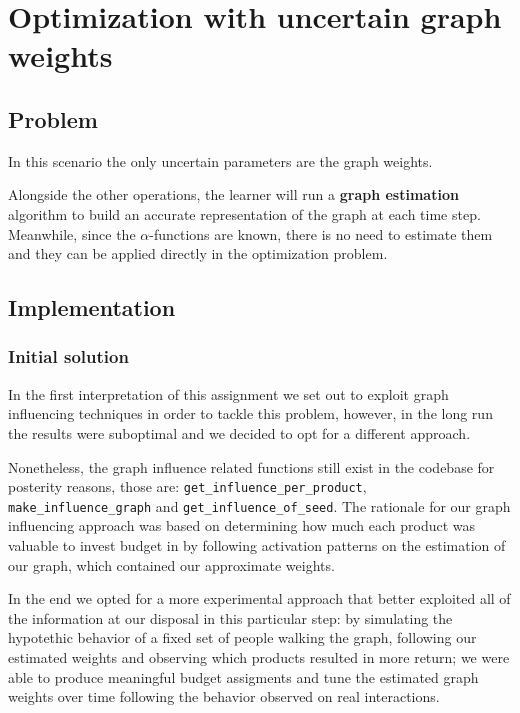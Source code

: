 \chapter{Optimization with uncertain graph weights}
\label{chap:unc_weights}

\section{Problem}
\label{sec:unc_w_problem}

In this scenario the only uncertain parameters are the graph weights.

Alongside the other operations, the learner will run a \textbf{graph estimation} algorithm to build an accurate representation of the graph at each time step.
Meanwhile, since the $\alpha$-functions are known, there is no need to estimate them and they can be applied directly in the optimization problem.

\section{Implementation}
\label{sec:unc_w_impl}

\subsection{Initial solution}

In the first interpretation of this assignment we set out to exploit graph influencing techniques in order to tackle this problem, however, in the long run the results were suboptimal and we decided to opt for a different approach.

Nonetheless, the graph influence related functions still exist in the codebase for posterity reasons, those are: \texttt{get\_influence\_per\_product}, \texttt{make\_influence\_graph} and \texttt{get\_influence\_of\_seed}.
The rationale for our graph influencing approach was based on determining how much each product was valuable to invest budget in by following activation patterns on the estimation of our graph, which contained our approximate weights.

In the end we opted for a more experimental approach that better exploited all of the information at our disposal in this particular step: by simulating the hypotethic behavior of a fixed set of people walking the graph, following our estimated weights and observing which products resulted in more return; we were able to produce meaningful budget assigments and tune the estimated graph weights over time following the behavior observed on real interactions.

